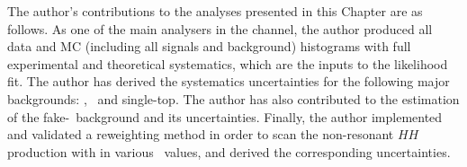 The author's contributions to the analyses presented in this Chapter are as follows.
As one of the main analysers in the \lephad channel, 
the author produced all data and MC (including all signals and background) 
histograms with full experimental and theoretical systematics, which are the inputs to the likelihood fit. 
The author has derived the systematics uncertainties for the following major backgrounds:
\ttbar, \ZHF\ and single-top. The author has also contributed to the estimation of the fake-\tauhad\
background and its uncertainties. 
Finally, the author implemented and validated a reweighting method in order to scan
the non-resonant $HH$ production with in various \kl\ values, and derived the corresponding
uncertainties. 
